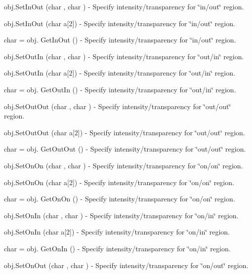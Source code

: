 \begin{DoxyItemize}
\item {\ttfamily obj.\-Set\-In\-Out (char , char )} -\/ Specify intensity/transparency for \char`\"{}in/out\char`\"{} region.  
\item {\ttfamily obj.\-Set\-In\-Out (char a\mbox{[}2\mbox{]})} -\/ Specify intensity/transparency for \char`\"{}in/out\char`\"{} region.  
\item {\ttfamily char = obj. Get\-In\-Out ()} -\/ Specify intensity/transparency for \char`\"{}in/out\char`\"{} region.  
\item {\ttfamily obj.\-Set\-Out\-In (char , char )} -\/ Specify intensity/transparency for \char`\"{}out/in\char`\"{} region.  
\item {\ttfamily obj.\-Set\-Out\-In (char a\mbox{[}2\mbox{]})} -\/ Specify intensity/transparency for \char`\"{}out/in\char`\"{} region.  
\item {\ttfamily char = obj. Get\-Out\-In ()} -\/ Specify intensity/transparency for \char`\"{}out/in\char`\"{} region.  
\item {\ttfamily obj.\-Set\-Out\-Out (char , char )} -\/ Specify intensity/transparency for \char`\"{}out/out\char`\"{} region.  
\item {\ttfamily obj.\-Set\-Out\-Out (char a\mbox{[}2\mbox{]})} -\/ Specify intensity/transparency for \char`\"{}out/out\char`\"{} region.  
\item {\ttfamily char = obj. Get\-Out\-Out ()} -\/ Specify intensity/transparency for \char`\"{}out/out\char`\"{} region.  
\item {\ttfamily obj.\-Set\-On\-On (char , char )} -\/ Specify intensity/transparency for \char`\"{}on/on\char`\"{} region.  
\item {\ttfamily obj.\-Set\-On\-On (char a\mbox{[}2\mbox{]})} -\/ Specify intensity/transparency for \char`\"{}on/on\char`\"{} region.  
\item {\ttfamily char = obj. Get\-On\-On ()} -\/ Specify intensity/transparency for \char`\"{}on/on\char`\"{} region.  
\item {\ttfamily obj.\-Set\-On\-In (char , char )} -\/ Specify intensity/transparency for \char`\"{}on/in\char`\"{} region.  
\item {\ttfamily obj.\-Set\-On\-In (char a\mbox{[}2\mbox{]})} -\/ Specify intensity/transparency for \char`\"{}on/in\char`\"{} region.  
\item {\ttfamily char = obj. Get\-On\-In ()} -\/ Specify intensity/transparency for \char`\"{}on/in\char`\"{} region.  
\item {\ttfamily obj.\-Set\-On\-Out (char , char )} -\/ Specify intensity/transparency for \char`\"{}on/out\char`\"{} region.  

\end{DoxyItemize}
